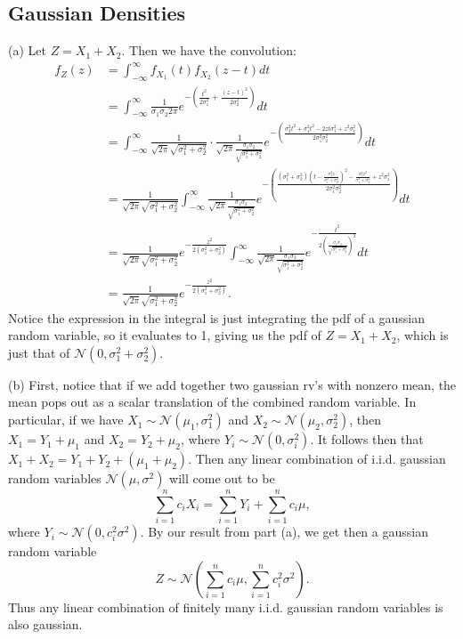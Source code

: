 \subsection{Gaussian Densities}
(a) Let $Z = X_1 + X_2$. Then we have the convolution:
\begin{align*}
    f_Z(z) &= \int_{-\infty}^\infty f_{X_1}(t)f_{X_2}(z - t) dt \\
        &= \int_{-\infty}^\infty \frac{1}{\sigma_1\sigma_2 2\pi} e^{-\left(\frac{t^2}{2\sigma_1^2} + \frac{(z - t)^2}{2\sigma_2^2}\right)} dt \\
        &= \int_{-\infty}^\infty \frac{1}{\sqrt{2\pi}\sqrt{\sigma_1^2 + \sigma_2^2}} \cdot \frac{1}{\sqrt{2\pi}\frac{\sigma_1\sigma_2}{\sqrt{\sigma_1^2 + \sigma_2^2}}} e^{-\left(\frac{\sigma_2^2t^2 + \sigma_1^2t^2 - 2zt\sigma_1^2 + z^2\sigma_1^2}{2\sigma_1^2\sigma_2^2}\right)} dt \\
        &= \frac{1}{\sqrt{2\pi}\sqrt{\sigma_1^2 + \sigma_2^2}} \int_{-\infty}^\infty \frac{1}{\sqrt{2\pi}\frac{\sigma_1\sigma_2}{\sqrt{\sigma_1^2 + \sigma_2^2}}} e^{-\left(\frac{(\sigma_1^2 + \sigma_2^2)\left(t - \frac{\sigma_1^2z}{\sigma_1^2 + \sigma_2^2}\right)^2 - \frac{\sigma_1^4z^2}{\sigma_1^2 + \sigma_2^2} + z^2\sigma_1^2}{2\sigma_1^2\sigma_2^2}\right)} dt \\
        &= \frac{1}{\sqrt{2\pi}\sqrt{\sigma_1^2 + \sigma_2^2}} e^{-\frac{z^2}{2(\sigma_1^2 + \sigma_2^2)}}\int_{-\infty}^\infty \frac{1}{\sqrt{2\pi}\frac{\sigma_1\sigma_2}{\sqrt{\sigma_1^2 + \sigma_2^2}}} e^{-\frac{t^2}{2\left(\frac{\sigma_1\sigma_2}{\sqrt{\sigma_1^2 + \sigma_2^2}}\right)^2}} dt \\
        &= \frac{1}{\sqrt{2\pi}\sqrt{\sigma_1^2 + \sigma_2^2}} e^{-\frac{z^2}{2(\sigma_1^2 + \sigma_2^2)}}.
\end{align*}
Notice the expression in the integral is just integrating the pdf of a gaussian random variable, so it evaluates to 1, giving us the pdf of $Z = X_1 + X_2$, which is just that of $\mathcal{N}(0, \sigma_1^2 + \sigma_2^2)$.

(b) First, notice that if we add together two gaussian rv's with nonzero mean, the mean pops out as a scalar translation of the combined random variable. In particular, if we have $X_1 \sim \mathcal{N}(\mu_1, \sigma_1^2)$ and $X_2 \sim \mathcal{N}(\mu_2, \sigma_2^2)$, then $X_1 = Y_1 + \mu_1$ and $X_2 = Y_2 + \mu_2$, where $Y_i \sim \mathcal{N}(0, \sigma_i^2)$. It follows then that $X_1 + X_2 = Y_1 + Y_2 + (\mu_1 + \mu_2)$. Then any linear combination of i.i.d. gaussian random variables $\mathcal{N}(\mu, \sigma^2)$ will come out to be
\[
    \sum_{i = 1}^n c_iX_i = \sum_{i = 1}^n Y_i + \sum_{i = 1}^n c_i\mu,
\]
where $Y_i \sim \mathcal{N}(0, c_i^2\sigma^2)$. By our result from part (a), we get then a gaussian random variable
\[
    Z \sim \mathcal{N}(\sum_{i = 1}^n c_i\mu, \sum_{i = 1}^n c_i^2\sigma^2).
\]
Thus any linear combination of finitely many i.i.d. gaussian random variables is also gaussian.

